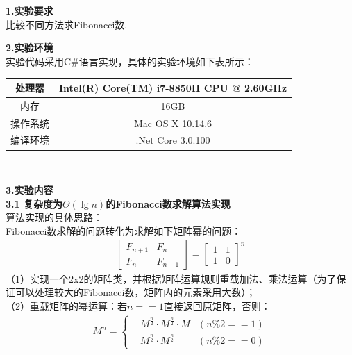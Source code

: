 \documentclass[a4paper]{article}
\begin{document}
\courseheader
{}

\info

\begin{enumerate}
  \setlength{\itemsep}{3\parskip}
  \textbf{1.实验要求}\\
  比较不同方法求Fibonacci数.\\
  \bigskip

  \textbf{2.实验环境}\\
  实验代码采用C\#语言实现，具体的实验环境如下表所示：\\ \medskip
  \begin{tabular}{c|c}
    \hline\hline
    处理器 & Intel(R) Core(TM) i7-8850H CPU @ 2.60GHz \\ \hline
    内存 & 16GB\\ \hline
    操作系统& Mac OS X 10.14.6\\ \hline
    编译环境& .Net Core 3.0.100\\
    \hline\hline
  \end{tabular}\\
  \bigskip

  \textbf{3.实验内容}\\
  \textbf{3.1 复杂度为$\Theta(\lg n)$的Fibonacci数求解算法实现}\\
  \medskip
  算法实现的具体思路：\\
  Fibonacci数求解的问题转化为求解如下矩阵幂的问题：
  \begin{align*}
    \begin{bmatrix} 
      F_{n+1} & F_n \\
      F_n & F_{n-1}
    \end{bmatrix}
    ={
    \begin{bmatrix} 
      1 & 1 \\
      1 & 0
    \end{bmatrix}
    }^n
  \end{align*}
  （1）实现一个2x2的矩阵类，并根据矩阵运算规则重载加法、乘法运算（为了保证可以处理较大的Fibonacci数，矩阵内的元素采用大数）；\\
  （2）重载矩阵的幂运算：若$n==1$直接返回原矩阵，否则：
  \begin{align*}
    M^n=\left\{
    \begin{aligned}
      &M^{\frac{n}{2}} \cdot M^{\frac{n}{2}} \cdot M &(n \% 2 == 1)\\
      &M^{\frac{n}{2}} \cdot M^{\frac{n}{2}} &(n \% 2 == 0)
    \end{aligned}
    \right.
  \end{align*}


\end{enumerate}
\end{document}
